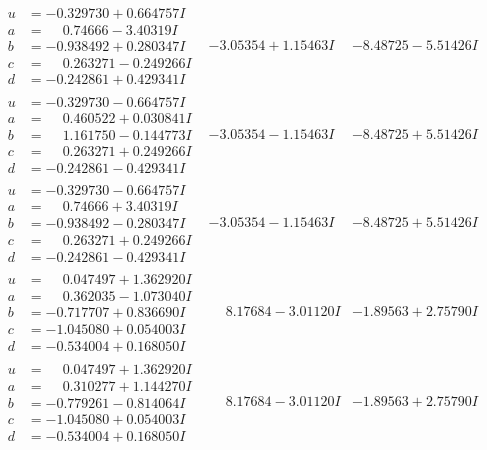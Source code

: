 \documentclass[1p]{elsarticle_modified}
\theoremstyle{definition}
\begin{document}
$$\begin{array}{c|c|c}
\begin{aligned}
u &= -0.329730 + 0.664757 I \\
a &= \phantom{-}0.74666 - 3.40319 I \\
b &= -0.938492 + 0.280347 I \\
c &= \phantom{-}0.263271 - 0.249266 I \\
d &= -0.242861 + 0.429341 I\end{aligned}
 & -3.05354 + 1.15463 I & -8.48725 - 5.51426 I \\ \hline\begin{aligned}
u &= -0.329730 - 0.664757 I \\
a &= \phantom{-}0.460522 + 0.030841 I \\
b &= \phantom{-}1.161750 - 0.144773 I \\
c &= \phantom{-}0.263271 + 0.249266 I \\
d &= -0.242861 - 0.429341 I\end{aligned}
 & -3.05354 - 1.15463 I & -8.48725 + 5.51426 I \\ \hline\begin{aligned}
u &= -0.329730 - 0.664757 I \\
a &= \phantom{-}0.74666 + 3.40319 I \\
b &= -0.938492 - 0.280347 I \\
c &= \phantom{-}0.263271 + 0.249266 I \\
d &= -0.242861 - 0.429341 I\end{aligned}
 & -3.05354 - 1.15463 I & -8.48725 + 5.51426 I \\ \hline\begin{aligned}
u &= \phantom{-}0.047497 + 1.362920 I \\
a &= \phantom{-}0.362035 - 1.073040 I \\
b &= -0.717707 + 0.836690 I \\
c &= -1.045080 + 0.054003 I \\
d &= -0.534004 + 0.168050 I\end{aligned}
 & \phantom{-}8.17684 - 3.01120 I & -1.89563 + 2.75790 I \\ \hline\begin{aligned}
u &= \phantom{-}0.047497 + 1.362920 I \\
a &= \phantom{-}0.310277 + 1.144270 I \\
b &= -0.779261 - 0.814064 I \\
c &= -1.045080 + 0.054003 I \\
d &= -0.534004 + 0.168050 I\end{aligned}
 & \phantom{-}8.17684 - 3.01120 I & -1.89563 + 2.75790 I\\

\end{array}$$
\end{document}

